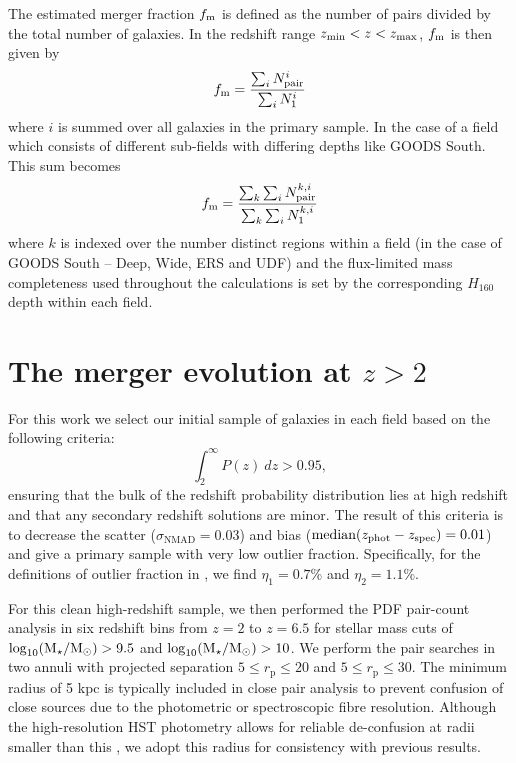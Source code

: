 The estimated merger fraction $f_{\rm{m}}$ is defined as the number of pairs divided by the total number of galaxies. In the redshift range $z_{\rm{min}} < z < z_{\rm{max}}$,  $f_{\rm{m}}$ is then given by 
\begin{equation}
f_{\rm{m}} = \frac{\sum_{i} N_{\text{pair}}^{i}}{\sum_{i} N_{1}^{i}}
\end{equation}
where $i$ is summed over all galaxies in the primary sample. In the case of a field which consists of different sub-fields with differing depths like GOODS South. This sum becomes 
\begin{equation}
f_{\rm{m}} = \frac{\sum_{k}\sum_{i} N_{\text{pair}}^{k,i}}{\sum_{k}\sum_{i} N_{1}^{k,i}}
\end{equation}
where $k$ is indexed over the number distinct regions within a field (in the case of GOODS South -- Deep, Wide, ERS and UDF) and the flux-limited mass completeness used throughout the calculations is set by the corresponding $H_{160}$ depth within each field.


\section{The merger evolution at $z > 2$}\label{sec:results}
 
For this work we select our initial sample of galaxies in each field based on the following criteria:
\begin{equation}
	\int_{2}^{\infty} P(z)~dz > 0.95, 
\end{equation}
ensuring that the bulk of the redshift probability distribution lies at high redshift and that any secondary redshift solutions are minor. The result of this criteria is to decrease the scatter ($\sigma_{\text{NMAD}} = 0.03$) and bias ($\text{median}(z_{\rm{phot}} - z_{\rm{spec}}) = 0.01$) and give a primary sample with very low outlier fraction. Specifically, for the definitions of outlier fraction in \citet{Molino:2014iz}, we find $\eta_{1} = 0.7\%$ and $\eta_{2} = 1.1\%$.

For this clean high-redshift sample, we then performed the PDF pair-count analysis in six redshift bins from $z = 2$ to $z = 6.5$ for stellar mass cuts of $\log_{10}(\text{M}_{\star} / \text{M}_{\odot}) > 9.5$ and $\log_{10}(\text{M}_{\star} / \text{M}_{\odot}) > 10$. We perform the pair searches in two annuli with projected separation $5 \leq r_{\text{p}} \leq 20$ and $5 \leq r_{\text{p}} \leq 30$. The minimum radius of 5 kpc is typically included in close pair analysis to prevent confusion of close sources due to the photometric or spectroscopic fibre resolution. Although the high-resolution HST photometry allows for reliable de-confusion at radii smaller than this \citep{Laidler:2007iy,Galametz:2013dd}, we adopt this radius for consistency with previous results.

